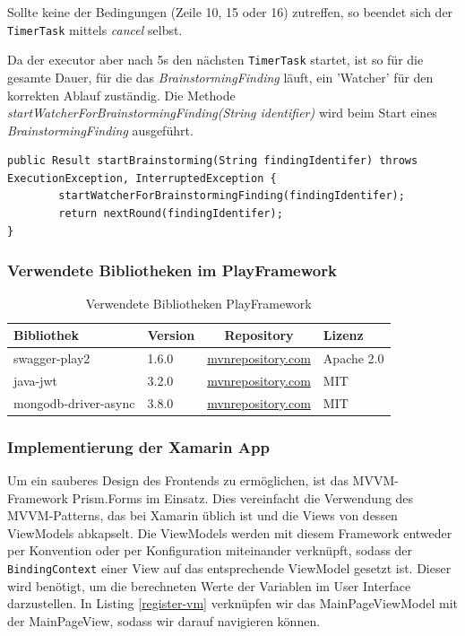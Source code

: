 Sollte keine der Bedingungen (Zeile 10, 15 oder 16) zutreffen, so beendet sich der \texttt{TimerTask} mittels \textit{cancel} selbst. 

Da der executor aber nach 5s den nächsten \texttt{TimerTask} startet, ist so für die gesamte Dauer, für die das \textit{BrainstormingFinding} läuft, ein 'Watcher' für den korrekten Ablauf zuständig. Die Methode \textit{startWatcherForBrainstormingFinding(String identifier)} wird beim Start eines \textit{BrainstormingFinding} ausgeführt.

\begin{lstlisting}
public Result startBrainstorming(String findingIdentifer) throws ExecutionException, InterruptedException {
        startWatcherForBrainstormingFinding(findingIdentifer);
        return nextRound(findingIdentifer);
}
\end{lstlisting}

\subsubsection{Verwendete Bibliotheken im PlayFramework}
\begin{table}[h]
	\centering
	\begin{tabular}{| l | l | c | l |}
		\hline
		\textbf{Bibliothek} & \textbf{Version} & \textbf{Repository} & \textbf{Lizenz}\\
		\hline
		swagger-play2 & 1.6.0 & \href{https://mvnrepository.com/artifact/io.swagger/swagger-play2_2.12/1.6.0}{mvnrepository.com} & Apache 2.0 \\
		java-jwt & 3.2.0 & \href{https://mvnrepository.com/artifact/com.auth0/java-jwt/3.2.0}{mvnrepository.com} & MIT \\
		mongodb-driver-async & 3.8.0 & \href{https://mvnrepository.com/artifact/org.mongodb/mongodb-driver-async/3.8.0}{mvnrepository.com} & MIT \\
		\hline
	\end{tabular}
	\caption[Story-Points]{Verwendete Bibliotheken PlayFramework}
	\label{tab:verwendete-libraries-play}
\end{table}

\subsubsection{Implementierung der Xamarin App}
Um ein sauberes Design des Frontends zu ermöglichen, ist das MVVM\--Framework Prism.Forms \cite{prism} im Einsatz. Dies vereinfacht die Verwendung des MVVM-Patterns, das bei Xamarin üblich ist und die Views von dessen ViewModels abkapselt. Die ViewModels werden mit diesem Framework entweder per Konvention oder per Konfiguration miteinander verknüpft, sodass der \texttt{BindingContext} einer View auf das entsprechende ViewModel gesetzt ist. Dieser wird benötigt, um die berechneten Werte der Variablen im User Interface darzustellen. In Listing \ref{register-vm} verknüpfen wir das MainPageViewModel mit der MainPageView, sodass wir darauf navigieren können. 

